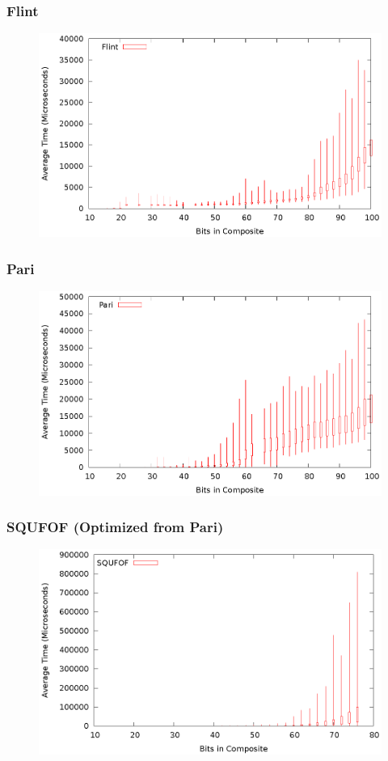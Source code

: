 \documentclass{beamer}
\begin{document}
\begin{frame}
\frametitle{Flint}
\begin{figure}
\includegraphics[scale=0.86]{factor-flint-whisker}
\end{figure}
\end{frame}
\begin{frame}
\frametitle{Pari}
\begin{figure}
\includegraphics[scale=0.86]{factor-pari-whisker}
\end{figure}
\end{frame}
\begin{frame}
\frametitle{SQUFOF (Optimized from Pari)}
\begin{figure}
\includegraphics[scale=0.86]{factor-squfof-whisker}
\end{figure}
\end{frame}
\end{document}
